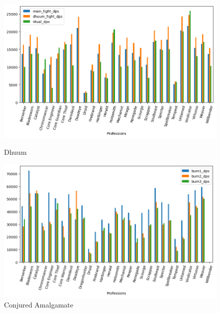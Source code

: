 \documentclass[12pt,a4paper]{article}
\begin{document}
    \begin{figure}[h!]
        
        \centering
        
        \includegraphics[width=1 \linewidth]{dhuum_dps_plot.png}
        \caption{Dhuum}
        \includegraphics[width=1 \linewidth]{ca_dps_plot.png}
        \caption{Conjured Amalgamate}
    \end{figure}

    \newpage
\end{document}
